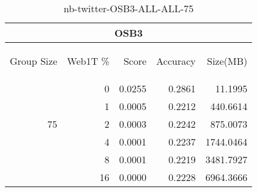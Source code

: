 \begin{center}
\begin{table}[htbp] 
 \begin{center}
\begin{tabular}{ | r | r | r | r | r |}
\hline
\multicolumn{5}{|c|}{OSB3}\\
\hline
\begin{sideways}Group Size\end{sideways} & \begin{sideways}Web1T \%\end{sideways} & \begin{sideways}Score\end{sideways} & \begin{sideways}Accuracy\end{sideways} & \begin{sideways}Size(MB)\end{sideways}\\
\hline
\multirow{5}{*}{75}
 & 0 & 0.0255 & 0.2861 & 11.1995\\ \cline{2-5}
 & 1 & 0.0005 & 0.2212 & 440.6614\\ \cline{2-5}
 & 2 & 0.0003 & 0.2242 & 875.0073\\ \cline{2-5}
 & 4 & 0.0001 & 0.2237 & 1744.0464\\ \cline{2-5}
 & 8 & 0.0001 & 0.2219 & 3481.7927\\ \cline{2-5}
 & 16 & 0.0000 & 0.2228 & 6964.3666\\ \cline{2-5}
\hline
\end{tabular}
\caption{nb-twitter-OSB3-ALL-ALL-75}
\label{table:nb-twitter-OSB3-ALL-ALL-75}
\end{center}
 \end{table}
\end{center}

